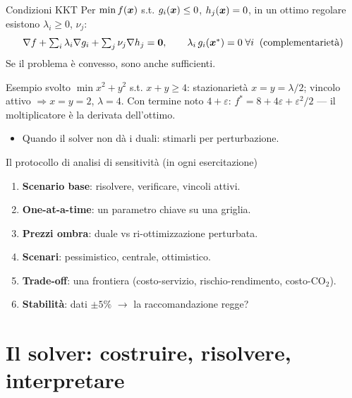 \documentclass[11pt,aspectratio=169]{beamer}
\begin{document}
\begin{frame}{Condizioni KKT}
Per $\min f(\boldsymbol{x})$ s.t. $g_i(\boldsymbol{x}) \le 0$, $h_j(\boldsymbol{x}) = 0$, in un ottimo
regolare esistono $\lambda_i \ge 0$, $\nu_j$:
\[
\nabla f + \textstyle\sum_i \lambda_i \nabla g_i + \sum_j \nu_j \nabla h_j = \boldsymbol{0},
\qquad \lambda_i\, g_i(\boldsymbol{x}^*) = 0 \;\forall i \;\;\text{(complementarietà)}
\]
Se il problema è convesso, sono anche \alert{sufficienti}.
\begin{block}{Esempio svolto}
$\min x^2 + y^2$ s.t. $x + y \ge 4$: stazionarietà $x = y = \lambda/2$; vincolo
attivo $\Rightarrow x = y = 2$, $\lambda = 4$. Con termine noto $4 + \varepsilon$:
$f^* = 8 + 4\varepsilon + \varepsilon^2/2$ --- il moltiplicatore è la derivata
dell'ottimo.
\end{block}
\begin{itemize}
  \item Quando il solver non dà i duali: stimarli \alert{per perturbazione}.
\end{itemize}
\end{frame}

\begin{frame}{Il protocollo di analisi di sensitività (in ogni esercitazione)}
\begin{enumerate}
  \item \textbf{Scenario base}: risolvere, verificare, vincoli attivi.
  \item \textbf{One-at-a-time}: un parametro chiave su una griglia.
  \item \textbf{Prezzi ombra}: duale vs ri-ottimizzazione perturbata.
  \item \textbf{Scenari}: pessimistico, centrale, ottimistico.
  \item \textbf{Trade-off}: una frontiera (costo-servizio, rischio-rendimento, costo-CO$_2$).
  \item \textbf{Stabilità}: dati $\pm 5\%$ $\to$ la raccomandazione regge?
\end{enumerate}
\end{frame}

\section{Il solver: costruire, risolvere, interpretare}
\end{document}
